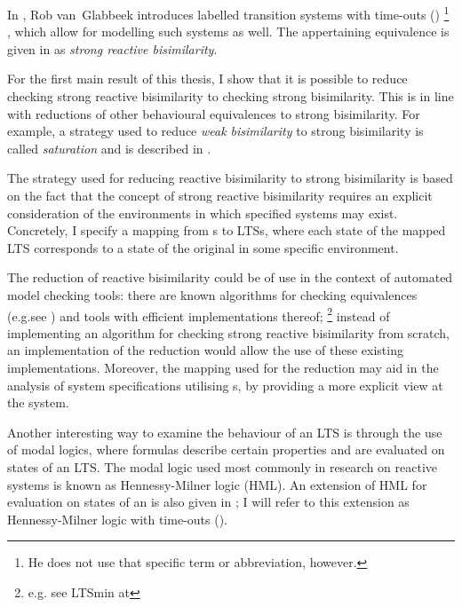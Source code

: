 \begin{isabellebody}
\begin{isamarkuptext}
\pagebreak
In \cite{vanglabbeek2021failure}, Rob van~Glabbeek introduces labelled transition systems with time-outs (\LTSt{})%
\footnote{He does not use that specific term or abbreviation, however.}%
, which allow for modelling such systems as well.
The appertaining equivalence is given in \cite{rbs} as \emph{strong reactive bisimilarity}.

For the first main result of this thesis, I show that it is possible to reduce checking strong reactive bisimilarity to checking strong bisimilarity. This is in line with reductions of other behavioural equivalences to strong bisimilarity. For example, a strategy used to reduce \emph{weak bisimilarity} to strong bisimilarity is called \emph{saturation} and is described in \cite[Section 3.2.5]{advBC_algorithmics}.

The strategy used for reducing reactive bisimilarity to strong bisimilarity is based on the fact that the concept of strong reactive bisimilarity requires an explicit consideration of the environments in which specified systems may exist. Concretely, I specify a mapping from \LTSt{}s to LTSs, where each state of the mapped LTS corresponds to a state of the original \LTSt{} in some specific environment.

The reduction of reactive bisimilarity could be of use in the context of automated model checking tools: there are known algorithms for checking equivalences (e.g.\@ see \cite{advBC_algorithmics}) and tools with efficient implementations thereof;%
\footnote{e.g. see LTSmin at }
instead of implementing an algorithm for checking strong reactive bisimilarity from scratch, an implementation of the reduction would allow the use of these existing implementations.
Moreover, the mapping used for the reduction may aid in the analysis of system specifications utilising \LTSt{}s, by providing a more explicit view at the system.

Another interesting way to examine the behaviour of an LTS is through the use of modal logics, where formulas describe certain properties and are evaluated on states of an LTS. The modal logic used most commonly in research on reactive systems is known as Hennessy-Milner logic (HML). 
An extension of HML for evaluation on states of an \LTSt{} is also given in \cite{rbs}; I will refer to this extension as Hennessy-Milner logic with time-outs (\HMLt{}).


\end{isamarkuptext}
\end{isabellebody}

